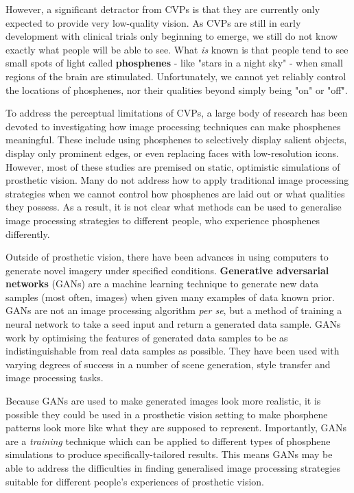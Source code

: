 \documentclass[a4paper,11pt,openany]{book}
\begin{document}
However, a significant detractor from CVPs is that they are currently only expected to provide very low-quality vision.
As CVPs are still in early development with clinical trials only beginning to emerge, we still do not know exactly what people will be able to see.
What \emph{is} known is that people tend to see small spots of light called \textbf{phosphenes} - like "stars in a night sky" - when small regions of the brain are stimulated.
Unfortunately, we cannot yet reliably control the locations of phosphenes, nor their qualities beyond simply being "on" or "off".

To address the perceptual limitations of CVPs, a large body of research has been devoted to investigating how image processing techniques can make phosphenes meaningful.
These include using phosphenes to selectively display salient objects, display only prominent edges, or even replacing faces with low-resolution icons.
However, most of these studies are premised on static, optimistic simulations of prosthetic vision.
Many do not address how to apply traditional image processing strategies when we cannot control how phosphenes are laid out or what qualities they possess.
As a result, it is not clear what methods can be used to generalise image processing strategies to different people, who experience phosphenes differently.

Outside of prosthetic vision, there have been advances in using computers to generate novel imagery under specified conditions.
\textbf{Generative adversarial networks} (GANs) are a machine learning technique to generate new data samples (most often, images) when given many examples of data known prior.
GANs are not an image processing algorithm \emph{per se}, but a method of training a neural network to take a seed input and return a generated data sample.
GANs work by optimising the features of generated data samples to be as indistinguishable from real data samples as possible.
They have been used with varying degrees of success in a number of scene generation, style transfer and image processing tasks.

Because GANs are used to make generated images look more realistic, it is possible they could be used in a prosthetic vision setting to make phosphene patterns look more like what they are supposed to represent.
Importantly, GANs are a \emph{training} technique which can be applied to different types of phosphene simulations to produce specifically-tailored results.
This means GANs may be able to address the difficulties in finding generalised image processing strategies suitable for different people's experiences of prosthetic vision.
\end{document}
